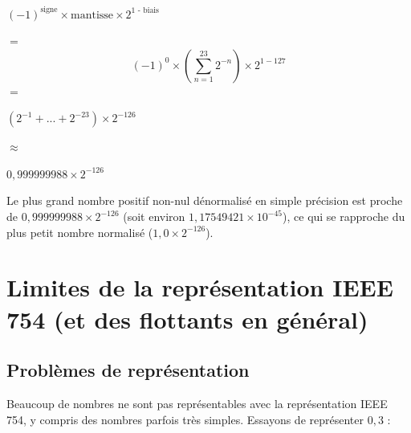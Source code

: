 \documentclass[11pt,a4paper]{article}
\begin{document}
\bigskip

\begin{center}
$ (-1)^{\text{signe}} \times \text{mantisse} \times 2^{\text{1 - biais}} $

\smallskip
$ = $
%
\[ (-1)^{\text{0}} \times ( \sum_{n=1}^{23} 2^{-n} ) \times 2^{1 - 127} \]
%
\smallskip
$ = $
\smallskip

$ (2^{-1} + ... + 2^{-23} ) \times 2^{-126} $

\smallskip
$ \approx $
\smallskip

$ 0,999999988 \times 2^{-126} $
\end{center}

Le plus grand nombre positif non-nul dénormalisé en simple précision est proche de $ 0,999999988 \times 2^{-126} $ (soit environ $ 1,175 494 21 \times 10^{-45} $), ce qui se rapproche du plus petit nombre normalisé ($ 1,0 \times 2^{-126} $).



\clearpage


\section{Limites de la représentation IEEE 754 (et des flottants en général)}

\subsection{Problèmes de représentation}

Beaucoup de nombres ne sont pas représentables avec la représentation IEEE 754, y compris des nombres parfois très simples.
Essayons de représenter $ 0,3 $ :

\medskip
\end{document}
